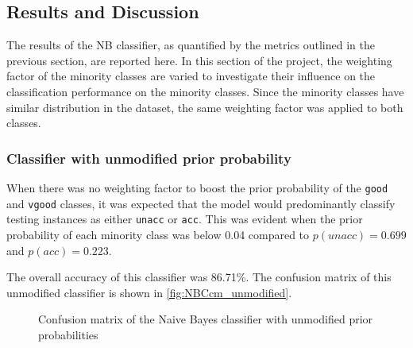 \documentclass[a4paper]{article}
\begin{document}
\subsection{Results and Discussion}
The results of the NB classifier, as quantified by the metrics outlined in the previous section, are reported here. In this section of the project, the weighting factor of the minority classes are varied to investigate their influence on the classification performance on the minority classes. Since the minority classes have similar distribution in the dataset, the same weighting factor was applied to both classes.

\subsubsection{Classifier with unmodified prior probability}
When there was no weighting factor to boost the prior probability of the \lstinline{good} and \lstinline{vgood} classes, it was expected that the model would predominantly classify testing instances as either \lstinline{unacc} or \lstinline{acc}. This was evident when the prior probability of each minority class was below 0.04 compared to $p(unacc)=0.699$ and $p(acc)=0.223$. 

The overall accuracy of this classifier was 86.71\%. The confusion matrix of this unmodified classifier is shown in \autoref{fig:NBCcm_unmodified}. 

\begin{figure} [h]
  \caption{Confusion matrix of the Naive Bayes classifier with unmodified prior probabilities} 
  \label{fig:NBCcm_unmodified}
\end{figure}
\end{document}
